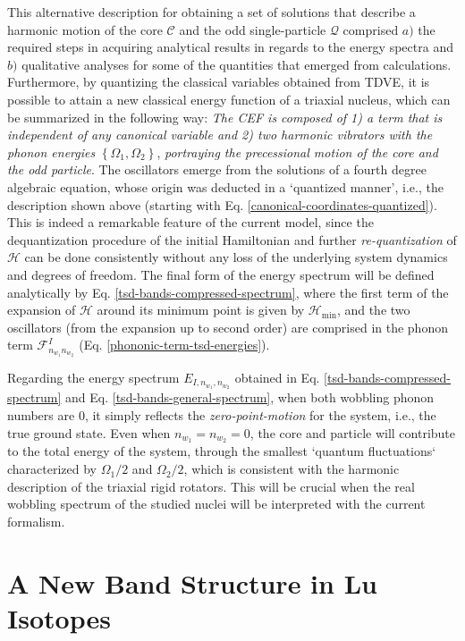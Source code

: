 This alternative description for obtaining a set of solutions that describe a harmonic motion of the core $\mathscr{C}$ and the odd single-particle $\mathcal{Q}$ comprised $a)$ the required steps in acquiring analytical results in regards to the energy spectra and $b)$ qualitative analyses for some of the quantities that emerged from calculations. Furthermore, by quantizing the classical variables obtained from TDVE, it is possible to attain a new classical energy function of a triaxial nucleus, which can be summarized in the following way: \emph{The CEF is composed of 1) a term that is independent of any canonical variable and 2) two harmonic vibrators with the phonon energies} $\left\{\Omega_1,\Omega_2\right\}$, \emph{portraying the precessional motion of the core and the odd particle}. The oscillators emerge from the solutions of a fourth degree algebraic equation, whose origin was deducted in a `quantized manner', i.e., the description shown above (starting with Eq. \ref{canonical-coordinates-quantized}). This is indeed a remarkable feature of the current model, since the dequantization procedure of the initial Hamiltonian and further \emph{re-quantization} of $\mathcal{H}$ can be done consistently without any loss of the underlying system dynamics and degrees of freedom. The final form of the energy spectrum will be defined analytically by Eq. \ref{tsd-bands-compressed-spectrum}, where the first term of the expansion of $\mathcal{H}$ around its minimum point is given by $\mathcal{H}_\text{min}$, and the two oscillators (from the expansion up to second order) are comprised in the phonon term $\mathcal{F}_{n_{w_1}n_{w_2}}^I$ (Eq. \ref{phononic-term-tsd-energies}).

Regarding the energy spectrum $E_{I,n_{w_1},n_{w_2}}$ obtained in Eq. \ref{tsd-bands-compressed-spectrum} and Eq. \ref{tsd-bands-general-spectrum}, when both wobbling phonon numbers are $0$, it simply reflects the \emph{zero-point-motion} for the system, i.e., the true ground state. Even when $n_{w_1}=n_{w_2}=0$, the core and particle will contribute to the total energy of the system, through the smallest `quantum fluctuations` characterized by $\Omega_1/2$ and $\Omega_2/2$, which is consistent with the harmonic description of the triaxial rigid rotators. This will be crucial when the real wobbling spectrum of the studied nuclei will be interpreted with the current formalism.

\section{A New Band Structure in Lu Isotopes}

